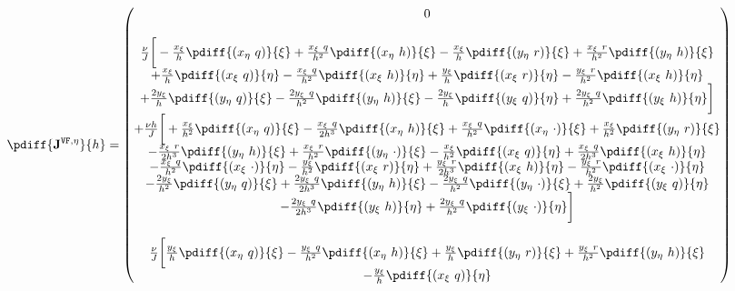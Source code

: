 \begin{align}
	\pdiff{\mathbf{J}^{\texttt{VF},\eta}}{h}=
		\begin{pmatrix}
		0 \\
		\\
		\frac{\nu}{J} \bigg[
		- \frac{x_{\xi} }{h}\pdiff{(x_{\eta}\ q)}{\xi}
		+ \frac{x_{\xi}\ q}{h^2}\pdiff{(x_{\eta}\ h)}{\xi}
		- \frac{x_{\xi}}{h} \pdiff{(y_{\eta}\ r)}{\xi}
		+ \frac{x_{\xi}\ r}{h^2}\pdiff{(y_{\eta}\ h)}{\xi}\\
		+ \frac{x_{\xi}}{h} \pdiff{(x_{\xi}\ q)}{\eta}
		- \frac{x_{\xi}\ q}{h^2}\pdiff{(x_{\xi}\ h)}{\eta}
		+ \frac{y_{\xi}}{h} \pdiff{(x_{\xi}\ r)}{\eta}
		- \frac{y_{\xi}\ r}{h^2} \pdiff{(x_{\xi}\ h)}{\eta}\\
		+ \frac{2 y_{\xi}}{h} \pdiff{(y_{\eta}\ q)}{\xi}
		- \frac{2 y_{\xi}\ q}{h^2} \pdiff{(y_{\eta}\ h)}{\xi}
		- \frac{2 y_{\xi}}{h} \pdiff{(y_{\xi}\ q)}{\eta}
		+ \frac{2 y_{\xi}\ q}{h^2} \pdiff{(y_{\xi}\ h)}{\eta}
		\bigg]\\
		+ \frac{\nu h}{J} \bigg[
		+ \frac{x_{\xi} }{h^2}\pdiff{(x_{\eta}\ q)}{\xi}
		- \frac{x_{\xi}\ q}{2h^3}\pdiff{(x_{\eta}\ h)}{\xi}
		+ \frac{x_{\xi}\ q}{h^2}\pdiff{(x_{\eta}\ \cdot)}{\xi}
		+ \frac{x_{\xi}}{h^2} \pdiff{(y_{\eta}\ r)}{\xi}\\
		- \frac{x_{\xi}\ r}{2h^3}\pdiff{(y_{\eta}\ h)}{\xi}
		+ \frac{x_{\xi}\ r}{h^2}\pdiff{(y_{\eta}\ \cdot)}{\xi}
		- \frac{x_{\xi}}{h^2} \pdiff{(x_{\xi}\ q)}{\eta}
		+ \frac{x_{\xi}\ q}{2h^3}\pdiff{(x_{\xi}\ h)}{\eta}\\
		- \frac{x_{\xi}\ q}{h^2}\pdiff{(x_{\xi}\ \cdot)}{\eta}
		- \frac{y_{\xi}}{h^2} \pdiff{(x_{\xi}\ r)}{\eta}
		+ \frac{y_{\xi}\ r}{2h^3} \pdiff{(x_{\xi}\ h)}{\eta}
		- \frac{y_{\xi}\ r}{h^2} \pdiff{(x_{\xi}\ \cdot)}{\eta}\\
		- \frac{2 y_{\xi}}{h^2} \pdiff{(y_{\eta}\ q)}{\xi}
		+ \frac{2 y_{\xi}\ q}{2h^3} \pdiff{(y_{\eta}\ h)}{\xi}
		- \frac{2 y_{\xi}\ q}{h^2} \pdiff{(y_{\eta}\ \cdot)}{\xi}
		+ \frac{2 y_{\xi}}{h^2} \pdiff{(y_{\xi}\ q)}{\eta} \\
		- \frac{2 y_{\xi}\ q}{2h^3} \pdiff{(y_{\xi}\ h)}{\eta}
		+ \frac{2 y_{\xi}\ q}{h^2} \pdiff{(y_{\xi}\ \cdot)}{\eta}
		\bigg]\\
		\\
		\frac{\nu}{J} \bigg[
		\frac{y_{\xi} }{h} \pdiff{(x_{\eta}\ q)}{\xi}
		- \frac{y_{\xi}\ q}{h^2} \pdiff{(x_{\eta}\ h)}{\xi}
		+ \frac{y_{\xi} }{h} \pdiff{(y_{\eta}\ r)}{\xi}
		+ \frac{y_{\xi}\ r}{h^2} \pdiff{(y_{\eta}\ h)}{\xi} \\
		- \frac{y_{\xi}}{h} \pdiff{(x_{\xi}\ q)}{\eta}

\end{pmatrix}
\end{align}
